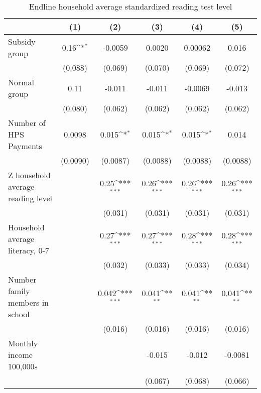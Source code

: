 \begin{table}[htbp]\centering
\def\sym#1{\ifmmode^{#1}\else\(^{#1}\)\fi}
\caption{Endline household average standardized reading test level}
\begin{tabular*}{1\hsize}{@{\hskip\tabcolsep\extracolsep\fill}l*{5}{c}}
\toprule
                &\multicolumn{1}{c}{(1)}         &\multicolumn{1}{c}{(2)}         &\multicolumn{1}{c}{(3)}         &\multicolumn{1}{c}{(4)}         &\multicolumn{1}{c}{(5)}         \\
\midrule
Subsidy group   &     0.16\sym{*}  &  -0.0059         &   0.0020         &  0.00062         &    0.016         \\
                &  (0.088)         &  (0.069)         &  (0.070)         &  (0.069)         &  (0.072)         \\
Normal group    &     0.11         &   -0.011         &   -0.011         &  -0.0069         &   -0.013         \\
                &  (0.080)         &  (0.062)         &  (0.062)         &  (0.062)         &  (0.062)         \\
Number of HPS Payments&   0.0098         &    0.015\sym{*}  &    0.015\sym{*}  &    0.015\sym{*}  &    0.014         \\
                & (0.0090)         & (0.0087)         & (0.0088)         & (0.0088)         & (0.0088)         \\
Z household average reading level&                  &     0.25\sym{***}&     0.26\sym{***}&     0.26\sym{***}&     0.26\sym{***}\\
                &                  &  (0.031)         &  (0.031)         &  (0.031)         &  (0.031)         \\
Household average literacy, 0-7&                  &     0.27\sym{***}&     0.27\sym{***}&     0.28\sym{***}&     0.28\sym{***}\\
                &                  &  (0.032)         &  (0.033)         &  (0.033)         &  (0.034)         \\
Number family members in school&                  &    0.042\sym{***}&    0.041\sym{**} &    0.041\sym{**} &    0.041\sym{**} \\
                &                  &  (0.016)         &  (0.016)         &  (0.016)         &  (0.016)         \\
Monthly income 100,000s&                  &                  &   -0.015         &   -0.012         &  -0.0081         \\
                &                  &                  &  (0.067)         &  (0.068)         &  (0.066)         \\

\end{tabular*}
\end{table}
